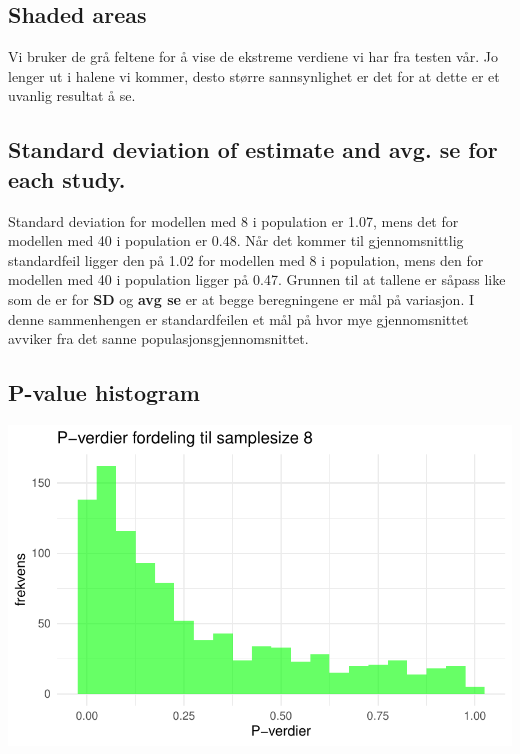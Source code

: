 \documentclass[
  letterpaper,
  DIV=11,
  numbers=noendperiod]{scrreprt}
\begin{document}
\subsection{Shaded areas}\label{shaded-areas}

Vi bruker de grå feltene for å vise de ekstreme verdiene vi har fra
testen vår. Jo lenger ut i halene vi kommer, desto større sannsynlighet
er det for at dette er et uvanlig resultat å se.

\subsection{\texorpdfstring{Standard deviation of \textbf{estimate} and
avg. \textbf{se} for each
study.}{Standard deviation of estimate and avg. se for each study.}}\label{standard-deviation-of-estimate-and-avg.-se-for-each-study.}

Standard deviation for modellen med 8 i population er 1.07, mens det for
modellen med 40 i population er 0.48. Når det kommer til gjennomsnittlig
standardfeil ligger den på 1.02 for modellen med 8 i population, mens
den for modellen med 40 i population ligger på 0.47. Grunnen til at
tallene er såpass like som de er for \textbf{SD} og \textbf{avg se} er
at begge beregningene er mål på variasjon. I denne sammenhengen er
standardfeilen et mål på hvor mye gjennomsnittet avviker fra det sanne
populasjonsgjennomsnittet.

\subsection{P-value histogram}\label{p-value-histogram}

\includegraphics{03-statistical-inference_files/figure-pdf/P-verdi histogram SS8-1.pdf}
\end{document}
